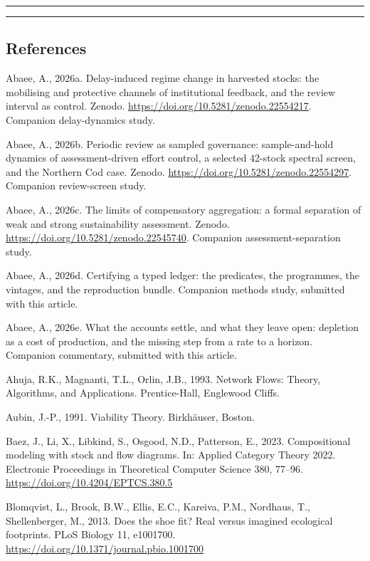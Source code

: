 \documentclass[11pt]{article}
\begin{document}
\begin{center}\rule{0.5\linewidth}{0.5pt}\end{center}

\begin{center}\rule{0.5\linewidth}{0.5pt}\end{center}

\subsection{References}\label{references}

Abaee, A., 2026a. Delay-induced regime change in harvested stocks: the
mobilising and protective channels of institutional feedback, and the
review interval as control. Zenodo.
\url{https://doi.org/10.5281/zenodo.22554217}. Companion delay-dynamics study.

Abaee, A., 2026b. Periodic review as sampled governance: sample-and-hold
dynamics of assessment-driven effort control, a selected 42-stock
spectral screen, and the Northern Cod case. Zenodo.
\url{https://doi.org/10.5281/zenodo.22554297}. Companion review-screen study.

Abaee, A., 2026c. The limits of compensatory aggregation: a formal separation of weak and strong sustainability assessment. Zenodo. \url{https://doi.org/10.5281/zenodo.22545740}. Companion assessment-separation study.

Abaee, A., 2026d. Certifying a typed ledger: the predicates, the programmes, the vintages, and the reproduction bundle. Companion methods study, submitted with this article.

Abaee, A., 2026e. What the accounts settle, and what they leave open: depletion as a cost of production, and the missing step from a rate to a horizon. Companion commentary, submitted with this article.

Ahuja, R.K., Magnanti, T.L., Orlin, J.B., 1993. Network Flows: Theory, Algorithms, and Applications. Prentice-Hall, Englewood Cliffs.

Aubin, J.-P., 1991. Viability Theory. Birkh\"auser, Boston.

Baez, J., Li, X., Libkind, S., Osgood, N.D., Patterson, E., 2023. Compositional modeling with stock and flow diagrams. In: Applied Category Theory 2022. Electronic Proceedings in Theoretical Computer Science 380, 77--96. \url{https://doi.org/10.4204/EPTCS.380.5}

Blomqvist, L., Brook, B.W., Ellis, E.C., Kareiva, P.M., Nordhaus, T.,
Shellenberger, M., 2013. Does the shoe fit? Real versus imagined
ecological footprints. PLoS Biology 11, e1001700.
\url{https://doi.org/10.1371/journal.pbio.1001700}
\end{document}
